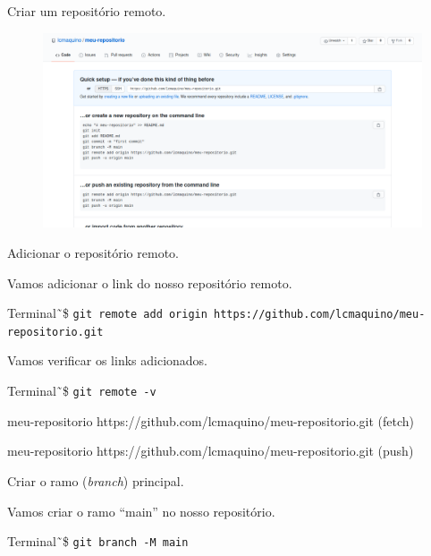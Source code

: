 \documentclass[brazil,aspectratio=169]{beamer}
\newcommand{\terminal}[1]{\textcolor{my-green}{\texttt{#1}}}
\begin{document}
\begin{frame}{Criar um repositório remoto.}

\begin{figure}
 \includegraphics[scale=0.3]{imagens/novo-repositorio-github-3}
\end{figure}
\end{frame}

\begin{frame}{Adicionar o repositório remoto.}

  Vamos adicionar o link do nosso repositório remoto.

  \begin{exampleblock}{Terminal}
    \~\,\$ \terminal{git remote add origin https://github.com/lcmaquino/meu-repositorio.git}
  \end{exampleblock}

  Vamos verificar os links adicionados.

  \begin{exampleblock}{Terminal}
    \~\,\$ \terminal{git remote -v}

    meu-repositorio	https://github.com/lcmaquino/meu-repositorio.git (fetch)

    meu-repositorio	https://github.com/lcmaquino/meu-repositorio.git (push)

  \end{exampleblock}
  
\end{frame}

\begin{frame}{Criar o ramo (\textit{branch}) principal.}

  Vamos criar o ramo ``main'' no nosso repositório.

  \begin{exampleblock}{Terminal}
    \~\,\$ \terminal{git branch -M main}
  \end{exampleblock}
  
\end{frame}
\end{document}
